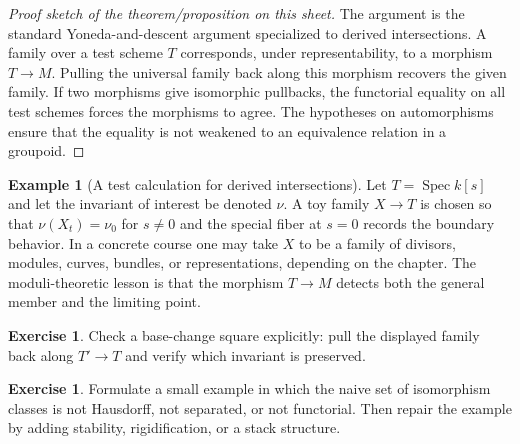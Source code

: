 \documentclass[11pt]{amsart}
\theoremstyle{definition}
\newtheorem{example}[theorem]{Example}
\newtheorem{exercise}[theorem]{Exercise}
\newcommand{\Spec}{\operatorname{Spec}}
\begin{document}
\begin{proof}[Proof sketch of the theorem/proposition on this sheet]
The argument is the standard Yoneda-and-descent argument specialized to derived intersections.  A family over a test scheme $T$ corresponds, under representability, to a morphism $T\to M$.  Pulling the universal family back along this morphism recovers the given family.  If two morphisms give isomorphic pullbacks, the functorial equality on all test schemes forces the morphisms to agree.  The hypotheses on automorphisms ensure that the equality is not weakened to an equivalence relation in a groupoid.
\end{proof}
\begin{example}[A test calculation for derived intersections]
Let $T=\Spec k[s]$ and let the invariant of interest be denoted $\nu$.  A toy family $X\to T$ is chosen so that $\nu(X_t)=\nu_0$ for $s\ne0$ and the special fiber at $s=0$ records the boundary behavior.  In a concrete course one may take $X$ to be a family of divisors, modules, curves, bundles, or representations, depending on the chapter.  The moduli-theoretic lesson is that the morphism $T\to M$ detects both the general member and the limiting point.
\end{example}
\begin{exercise}
Check a base-change square explicitly: pull the displayed family back along $T\prime\to T$ and verify which invariant is preserved.
\end{exercise}
\begin{exercise}
Formulate a small example in which the naive set of isomorphism classes is not Hausdorff, not separated, or not functorial.  Then repair the example by adding stability, rigidification, or a stack structure.
\end{exercise}
\clearpage
\end{document}

